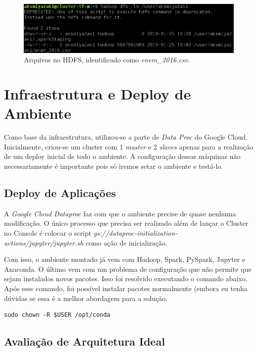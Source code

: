 \documentclass{article}
\begin{document}
\begin{figure}[H]
  \includegraphics[width=\linewidth]{img/file_hdfs.png}
  \caption{Arquivos no HDFS, identificado como \emph{enem\_2016.csv}.}
  \label{fig:data_on_hdfs}
\end{figure}

\newpage
\section{Infraestrutura e Deploy de Ambiente}

Como base da infraestrutura, utilizou-se a parte de \emph{Data Proc} do Google Cloud. Inicialmente, criou-se um cluster com 1 \emph{master} e 2 \emph{slaves} apenas para a realização de um deploy inicial de todo o ambiente. A configuração dessas máquinas não necessariamente é importante pois só iremos setar o ambiente e testá-lo.

\subsection{Deploy de Aplicações}

A \emph{Google Cloud Dataproc} faz com que o ambiente precise de quase nenhuma modificação. O único processo que precisa ser realizado além de lançar o Cluster no Console é colocar o script \emph{gs://dataproc-initialization-actions/jupyter/jupyter.sh} como ação de inicialização.

Com isso, o ambiente montado já vem com Hadoop, Spark, PySpark, Jupyter e Anaconda. O último vem com um problema de configuração que não permite que sejam instalados novos pacotes. Isso foi resolvido executando o comando abaixo. Após esse comando, foi possível instalar pacotes normalmente (embora eu tenha dúvidas se essa é a melhor abordagem para a solução.

\begin{lstlisting}[caption= {Solução de problema de Permissão.},captionpos=b]
sudo chown -R $USER /opt/conda
\end{lstlisting}

\subsection{Avaliação de Arquitetura Ideal}
\end{document}
